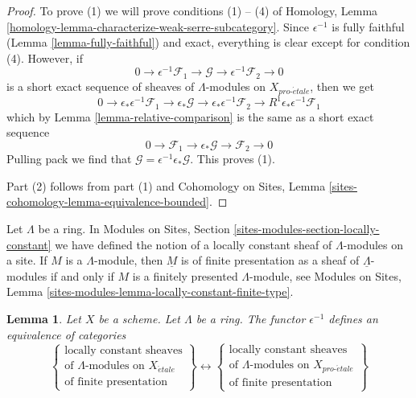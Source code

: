 \documentclass{stacks-project}
\theoremstyle{plain}
\newtheorem{lemma}[subsection]{Lemma}
\theoremstyle{definition}
\theoremstyle{remark}
\numberwithin{equation}{subsection}
\def\proetale{{pro\text{-}\acute{e}tale}}
\def\etale{{\acute{e}tale}}
\begin{document}
\begin{proof}
To prove (1) we will prove conditions (1) -- (4) of
Homology, Lemma \ref{homology-lemma-characterize-weak-serre-subcategory}.
Since $\epsilon^{-1}$ is fully faithful (Lemma \ref{lemma-fully-faithful})
and exact, everything is clear except for condition (4).
However, if
$$
0 \to \epsilon^{-1}\mathcal{F}_1 \to \mathcal{G} \to
\epsilon^{-1}\mathcal{F}_2 \to 0
$$
is a short exact sequence of sheaves of $\Lambda$-modules on $X_\proetale$,
then we get
$$
0 \to \epsilon_*\epsilon^{-1}\mathcal{F}_1 \to \epsilon_*\mathcal{G} \to
\epsilon_*\epsilon^{-1}\mathcal{F}_2 \to
R^1\epsilon_*\epsilon^{-1}\mathcal{F}_1
$$
which by Lemma \ref{lemma-relative-comparison}
is the same as a short exact sequence
$$
0 \to \mathcal{F}_1 \to \epsilon_*\mathcal{G} \to \mathcal{F}_2 \to 0
$$
Pulling pack we find that $\mathcal{G} = \epsilon^{-1}\epsilon_*\mathcal{G}$.
This proves (1).

\medskip\noindent
Part (2) follows from part (1) and Cohomology on Sites,
Lemma \ref{sites-cohomology-lemma-equivalence-bounded}.
\end{proof}

\noindent
Let $\Lambda$ be a ring. In
Modules on Sites, Section \ref{sites-modules-section-locally-constant}
we have defined the notion of a locally constant sheaf of $\Lambda$-modules
on a site. If $M$ is a $\Lambda$-module, then $\underline{M}$ is of finite
presentation as a sheaf of $\underline{\Lambda}$-modules if and only
if $M$ is a finitely presented $\Lambda$-module, see
Modules on Sites, Lemma \ref{sites-modules-lemma-locally-constant-finite-type}.

\begin{lemma}
\label{lemma-compare-locally-constant}
Let $X$ be a scheme. Let $\Lambda$ be a ring.
The functor $\epsilon^{-1}$ defines an equivalence of categories
$$
\left\{
\begin{matrix}
\text{locally constant sheaves}\\
\text{of }\Lambda\text{-modules on }X_\etale\\
\text{of finite presentation}
\end{matrix}
\right\}
\longleftrightarrow
\left\{
\begin{matrix}
\text{locally constant sheaves}\\
\text{of }\Lambda\text{-modules on }X_\proetale\\
\text{of finite presentation}
\end{matrix}
\right\}
$$
\end{lemma}
\end{document}

